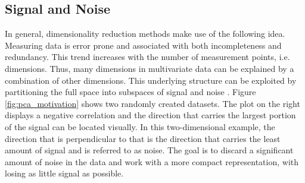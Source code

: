 \documentclass[../../../main.tex]{subfiles}
\begin{document}
\subsection{Signal and Noise}

In general, dimensionality reduction methods make use of the following idea. Measuring data is error prone and associated with both incompleteness and redundancy. This trend increases with the number of measurement points, i.e. dimensions. Thus, many dimensions in multivariate data can be explained by a combination of other dimensions. This underlying structure can be exploited by partitioning the full space into subspaces of signal and noise \cite[217]{sco_2015}. Figure \ref{fig:pca_motivation} shows two randomly created datasets. The plot on the right displays a negative correlation and the direction that carries the largest portion of the signal can be located visually. In this two-dimensional example, the direction that is perpendicular to that is the direction that carries the least amount of signal and is referred to as noise. The goal is to discard a significant amount of noise in the data and work with a more compact representation, with losing as little signal as possible.

    
    
\end{document}

